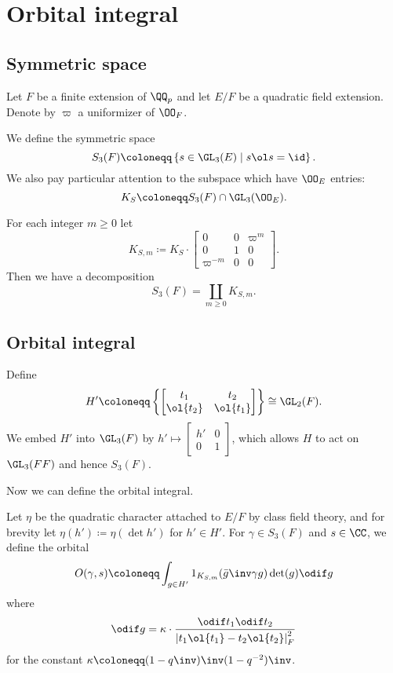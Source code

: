 \chapter{Orbital integral}
\section{Symmetric space}
Let $F$ be a finite extension of $\QQ_p$ and
let $E/F$ be a quadratic field extension.
Denote by $\varpi$ a uniformizer of $\OO_F$.

We define the symmetric space
\[ S_3(F) \coloneqq \left\{ s \in \GL_3(E) \mid s \ol s = \id \right\}. \]
We also pay particular attention to the subspace which have $\OO_E$ entries:
\[ K_S \coloneqq S_3(F) \cap \GL_3(\OO_E). \]
\begin{lemma}
  For each integer $m \ge 0$ let
  \[ K_{S,m} \coloneqq K_S \cdot \begin{bmatrix} 0 & 0 & \varpi^m \\ 0 & 1 & 0 \\ \varpi^{-m} & 0 & 0 \end{bmatrix}. \]
  Then we have a decomposition
  \[ S_3(F) = \coprod_{m \geq 0} K_{S,m}. \]
\end{lemma}

\section{Orbital integral}
Define
\[
  H' \coloneqq
  \left\{ \begin{bmatrix} t_1 & t_2 \\ \ol{t_2} & \ol{t_1} \end{bmatrix} \right\}
  \cong \GL_2(F).
\]
We embed $H'$ into $\GL_3(F)$ by
$h' \mapsto \left[ \begin{smallmatrix} h' & 0 \\ 0 &1 \end{smallmatrix} \right]$,
which allows $H$ to act on $\GL_3(FF)$ and hence $S_3(F)$.

Now we can define the orbital integral.
\begin{definition}
  Let $\eta$ be the quadratic character attached to $E/F$ by class field theory,
  and for brevity let $\eta(h') \coloneqq \eta(\det h')$ for $h' \in H'$.
  For $\gamma \in S_3(F)$ and $s \in \CC$, we define the orbital
  \[ O(\gamma, s) \coloneqq
    \int_{g \in H'} 1_{K_{S,m}}(\bar g\inv \gamma g) \det(g) \odif g \]
  where
  \[ \odif g = \kappa \cdot \frac{\odif t_1 \odif t_2}
    {\left\lvert t_1 \ol{t_1} - t_2 \ol{t_2} \right\rvert_F^2} \]
  for the constant $\kappa \coloneqq (1-q\inv)\inv(1-q^{-2})\inv$.
\end{definition}

